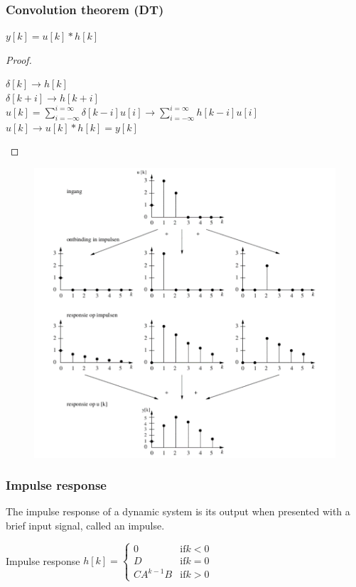 \begin{frame}
	\frametitle{Convolution theorem (DT)}
	\begin{theorem}
		$y[k] = u[k] \ast h[k]$
	\end{theorem}
	\begin{proof}
		\begin{center}
				$ \delta[k] \rightarrow h[k]$\\
				$ \delta[k+i] \rightarrow h[k+i]$\\
				$ u[k] = \sum\limits_{i=-\infty}^{i=\infty}\delta[k-i]u[i] \rightarrow \sum\limits_{i=-\infty}^{i=\infty}h[k-i]u[i]$\\
				$u[k] \rightarrow u[k] \ast h[k] = y[k] $
		\end{center}
	\end{proof}
\end{frame}
\begin{frame}
	\begin{figure}
\centering
\includegraphics[height=0.8\textheight]{Images/discrete_time_systems_20}

\end{figure}

\end{frame}
\begin{frame}
	\frametitle{Impulse response}
	\begin{definition}
		The impulse response of a dynamic system is its output when presented with a brief input signal, called an impulse.
	\end{definition}
	\begin{block}{Impulse response}
		$h[k] = \begin{cases}
			0  & \text{if} k <  0 \\
			D & \text{if} k= 0 \\ 
			CA^{k-1}B & \text{if} k> 0 
		\end{cases}$
	\end{block}
\end{frame}
